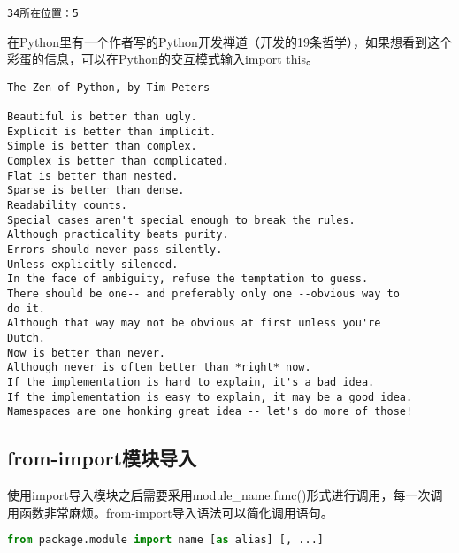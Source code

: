 \begin{tcolorbox}
	\begin{verbatim}
34所在位置：5
\end{verbatim}
\end{tcolorbox}

在Python里有一个作者写的Python开发禅道（开发的19条哲学），如果想看到这个彩蛋的信息，可以在Python的交互模式输入import this。\\

\vspace{-0.5cm}

\begin{tcolorbox}
	\begin{verbatim}
The Zen of Python, by Tim Peters

Beautiful is better than ugly.
Explicit is better than implicit.
Simple is better than complex.
Complex is better than complicated.
Flat is better than nested.
Sparse is better than dense.
Readability counts.
Special cases aren't special enough to break the rules.
Although practicality beats purity.
Errors should never pass silently.
Unless explicitly silenced.
In the face of ambiguity, refuse the temptation to guess.
There should be one-- and preferably only one --obvious way to
do it.
Although that way may not be obvious at first unless you're
Dutch.
Now is better than never.
Although never is often better than *right* now.
If the implementation is hard to explain, it's a bad idea.
If the implementation is easy to explain, it may be a good idea.
Namespaces are one honking great idea -- let's do more of those!
\end{verbatim}
\end{tcolorbox}

\vspace{0.5cm}

\subsection{from-import模块导入}

使用import导入模块之后需要采用module\_name.func()形式进行调用，每一次调用函数非常麻烦。from-import导入语法可以简化调用语句。\\

\vspace{-0.5cm}

\begin{lstlisting}[language=Python]
from package.module import name [as alias] [, ...]
\end{lstlisting}

